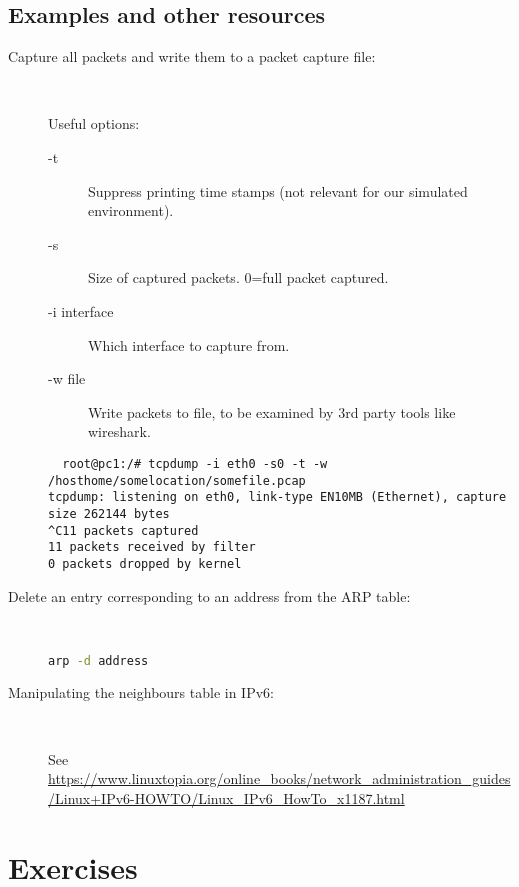 \documentclass[12pt]{book}
\begin{document}
\subsection{Examples and other resources}\label{examples.lab1}

\begin{description}
\item[Capture all packets and write them to a packet capture file:] ~

  Useful options:
  \begin{description}
    \item [-t] Suppress printing time stamps (not relevant for our
      simulated environment).
    \item [-s] Size of captured packets. 0=full packet captured.
    \item [-i interface] Which interface to capture from.
    \item [-w file] Write packets to file, to be examined by 3rd party
      tools like wireshark.
  \end{description}
  
  {\small
\begin{verbatim}
  root@pc1:/# tcpdump -i eth0 -s0 -t -w /hosthome/somelocation/somefile.pcap
tcpdump: listening on eth0, link-type EN10MB (Ethernet), capture size 262144 bytes
^C11 packets captured
11 packets received by filter
0 packets dropped by kernel
\end{verbatim}
  }
  
\item[Delete an entry corresponding to an address from the ARP
  table:]~

\begin{lstlisting}[language=bash]
      arp -d address
\end{lstlisting}

\item[Manipulating the neighbours table in IPv6:]~

See \url{https://www.linuxtopia.org/online_books/network_administration_guides/Linux+IPv6-HOWTO/Linux_IPv6_HowTo_x1187.html}

\end{description}

\section{Exercises}
\end{document}
